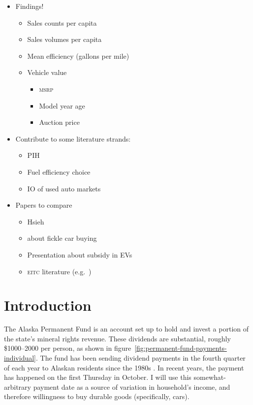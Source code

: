 \documentclass[11pt,letterpaper,oneside]{article}
\newcommand{\msrp}{\textsc{msrp}}
\newcommand{\eitc}{\textsc{eitc}}
\begin{document}
\begin{itemize}
    \item Findings!
    \begin{itemize}
        \item Sales counts per capita
        \item Sales volumes per capita
        \item Mean efficiency (gallons per mile)
        \item Vehicle value
        \begin{itemize}
            \item \msrp{}
            \item Model year age
            \item Auction price
        \end{itemize}
    \end{itemize}
    \item Contribute to some literature strands:
    \begin{itemize}
        \item PIH
        \item Fuel efficiency choice
        \item IO of used auto markets
    \end{itemize}
    \item Papers to compare
    \begin{itemize}
        \item Hsieh
        \item \textcite{Busse2015_weather_on_cars} about fickle car buying
        \item Presentation about subsidy in EVs
        \item \eitc{} literature (e.g.\ \cite{goodman2008eitc})
    \end{itemize}
\end{itemize}

\pagebreak
\section{Introduction}


The Alaska Permanent Fund is an account set up to hold and invest a portion of the state's mineral rights revenue.
These dividends are substantial, roughly \$1000--2000 per person, as shown in figure~\ref{fig:permanent-fund-payments-individual}.
The fund has been sending dividend payments in the fourth quarter of each year to Alaskan residents since the 1980s \parencite{hsieh2003}.
In recent years, the payment has happened on the first Thursday in October.
I will use this somewhat-arbitrary payment date as a source of variation in household's income, and therefore willingness to buy durable goods (specifically, cars).
\end{document}
